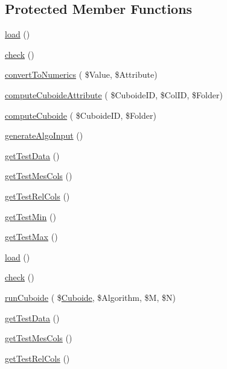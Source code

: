 \subsection*{Protected Member Functions}
\begin{DoxyCompactItemize}
\item 
\hyperlink{class_analysis_a212eda5284530c04b1e068cf53387215}{load} ()
\item 
\hyperlink{class_analysis_a25f3a02a783d2e29d3fd4d8c4a03cc4d}{check} ()
\item 
\hyperlink{class_analysis_a05e903b76ee7c35803cc1a7f779ad699}{convert\+To\+Numerics} ( \$Value, \$Attribute)
\item 
\hyperlink{class_analysis_af6dda0245ca2b9e4e5a736c46311d05c}{compute\+Cuboide\+Attribute} ( \$Cuboide\+ID, \$Col\+ID, \$Folder)
\item 
\hyperlink{class_analysis_ad9a44950c6c52270f9734ee4f2b2c05b}{compute\+Cuboide} ( \$Cuboide\+ID, \$Folder)
\item 
\hyperlink{class_analysis_a6a342ad151dc1807858480b8f024cddf}{generate\+Algo\+Input} ()
\item 
\hyperlink{class_analysis_a03e4f465ff77ad240a13f25de5c559b3}{get\+Test\+Data} ()
\item 
\hyperlink{class_analysis_aa52531fa97647772150dd607133bd355}{get\+Test\+Mes\+Cols} ()
\item 
\hyperlink{class_analysis_a2a26317d11c76f0100c16807b3d5cd4e}{get\+Test\+Rel\+Cols} ()
\item 
\hyperlink{class_analysis_ae60332a39d4ae552bf601a683a219f09}{get\+Test\+Min} ()
\item 
\hyperlink{class_analysis_aa62e20d065337e6c23e2840e02235b69}{get\+Test\+Max} ()
\item 
\hyperlink{class_analysis_a212eda5284530c04b1e068cf53387215}{load} ()
\item 
\hyperlink{class_analysis_a25f3a02a783d2e29d3fd4d8c4a03cc4d}{check} ()
\item 
\hyperlink{class_analysis_a9cda19ef90a12fd21523975730dd769d}{run\+Cuboide} ( \$\hyperlink{class_cuboide}{Cuboide}, \$Algorithm, \$M, \$N)
\item 
\hyperlink{class_analysis_a03e4f465ff77ad240a13f25de5c559b3}{get\+Test\+Data} ()
\item 
\hyperlink{class_analysis_aa52531fa97647772150dd607133bd355}{get\+Test\+Mes\+Cols} ()
\item 
\hyperlink{class_analysis_a2a26317d11c76f0100c16807b3d5cd4e}{get\+Test\+Rel\+Cols} ()
\end{DoxyCompactItemize}
